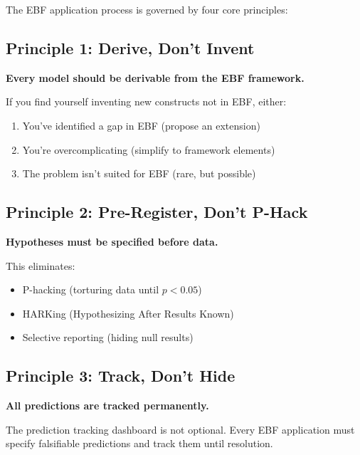 The EBF application process is governed by four core principles:

\subsection{Principle 1: Derive, Don't Invent}

\begin{tcolorbox}[colback=blue!5!white, colframe=blue!75!black]
\textbf{Every model should be derivable from the EBF framework.}

If you find yourself inventing new constructs not in EBF, either:
\begin{enumerate}[nosep]
    \item You've identified a gap in EBF (propose an extension)
    \item You're overcomplicating (simplify to framework elements)
    \item The problem isn't suited for EBF (rare, but possible)
\end{enumerate}
\end{tcolorbox}

\subsection{Principle 2: Pre-Register, Don't P-Hack}

\begin{tcolorbox}[colback=blue!5!white, colframe=blue!75!black]
\textbf{Hypotheses must be specified before data.}

This eliminates:
\begin{itemize}[nosep]
    \item P-hacking (torturing data until $p < 0.05$)
    \item HARKing (Hypothesizing After Results Known)
    \item Selective reporting (hiding null results)
\end{itemize}
\end{tcolorbox}

\subsection{Principle 3: Track, Don't Hide}

\begin{tcolorbox}[colback=blue!5!white, colframe=blue!75!black]
\textbf{All predictions are tracked permanently.}

The prediction tracking dashboard is not optional. Every EBF application
must specify falsifiable predictions and track them until resolution.
\end{tcolorbox}

